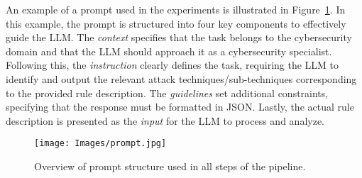 An example of a prompt used in the experiments is illustrated in Figure~\ref{fig:prompt}. 
In this example, the prompt is structured into four key components to effectively guide the LLM. 
The \textit{context} %
specifies that the task belongs to the cybersecurity domain and that the LLM should approach it as a cybersecurity specialist. 
Following this, the \textit{instruction} clearly defines the task, requiring the LLM to identify and output the relevant attack techniques/sub-techniques corresponding to the provided rule description. 
The \textit{guidelines} set additional constraints, specifying that the response must be formatted in JSON. 
Lastly, the actual rule description is presented as the \textit{input} for the LLM to process and analyze.

\begin{figure}[ht!]
    \centering
    \texttt{[image: Images/prompt.jpg]}
    \caption{Overview of prompt structure used in all steps of the pipeline.}
    \label{fig:prompt}
\end{figure} 





